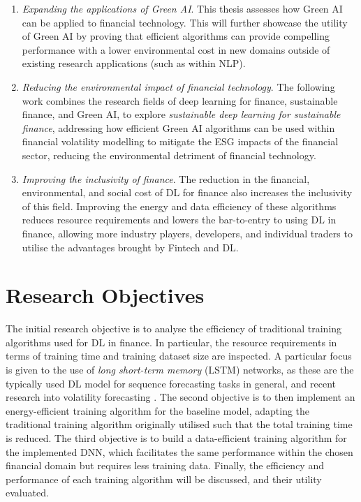 \documentclass[a4paper, 11pt]{report}
\begin{document}
    \begin{enumerate}
        \item \emph{Expanding the applications of Green AI}. This thesis assesses how Green AI can be applied to financial technology. This will further showcase the utility of Green AI by proving that efficient algorithms can provide compelling performance with a lower environmental cost in new domains outside of existing research applications (such as within NLP).
        \item \emph{Reducing the environmental impact of financial technology}. The following work combines the research fields of deep learning for finance, sustainable finance, and Green AI, to explore \emph{sustainable deep learning for sustainable finance}, addressing how efficient Green AI algorithms can be used within financial volatility modelling to mitigate the ESG impacts of the financial sector, reducing the environmental detriment of financial technology.
        \item \emph{Improving the inclusivity of finance}. The reduction in the financial, environmental, and social cost of DL for finance also increases the inclusivity of this field. Improving the energy and data efficiency of these algorithms reduces resource requirements and lowers the bar-to-entry to using DL in finance, allowing more industry players, developers, and individual traders to utilise the advantages brought by Fintech and DL.
    \end{enumerate}


    \section{Research Objectives}

    The initial research objective is to analyse the efficiency of traditional training algorithms used for DL in finance. In particular, the resource requirements in terms of training time and training dataset size are inspected. A particular focus is given to the use of \emph{long short-term memory} (LSTM) networks, as these are the typically used DL model for sequence forecasting tasks in general, and recent research into volatility forecasting \citep{xiong-2015}. The second objective is to then implement an energy-efficient training algorithm for the baseline model, adapting the traditional training algorithm originally utilised such that the total training time is reduced. The third objective is to build a data-efficient training algorithm for the implemented DNN, which facilitates the same performance within the chosen financial domain but requires less training data. Finally, the efficiency and performance of each training algorithm will be discussed, and their utility evaluated.
\end{document}
